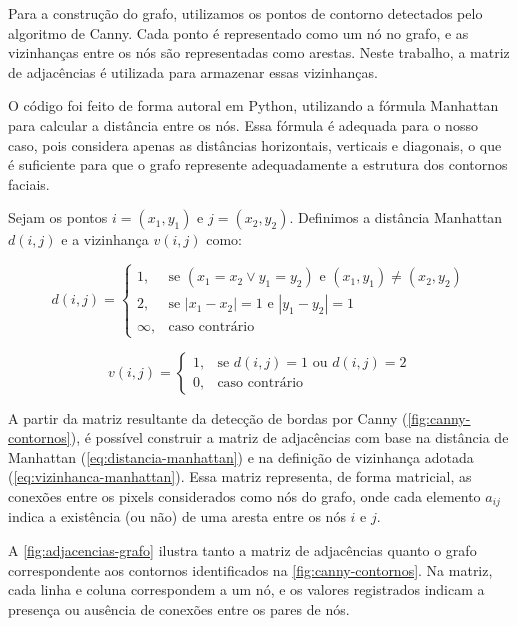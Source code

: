 Para a construção do grafo, utilizamos os pontos de contorno detectados pelo algoritmo de Canny. Cada ponto é representado como um nó no grafo, e as vizinhanças entre os nós são representadas como arestas. Neste trabalho, a matriz de adjacências é utilizada para armazenar essas vizinhanças.

O código foi feito de forma autoral em Python, utilizando a fórmula Manhattan para calcular a distância entre os nós. Essa fórmula é adequada para o nosso caso, pois considera apenas as distâncias horizontais, verticais e diagonais, o que é suficiente para que o grafo represente adequadamente a estrutura dos contornos faciais.

Sejam os pontos \( i = (x_1, y_1) \) e \( j = (x_2, y_2) \). Definimos a distância Manhattan \( d(i, j) \) e a vizinhança \( v(i, j) \) como:

\begin{equation}
    \label{eq:distancia-manhattan}
    d(i, j) =
    \begin{cases}
    1, & \text{se } (x_1 = x_2 \lor y_1 = y_2) \text{ e } (x_1, y_1) \neq (x_2, y_2) \\
    2, & \text{se } |x_1 - x_2| = 1 \text{ e } |y_1 - y_2| = 1 \\
    \infty, & \text{caso contrário}
    \end{cases}
\end{equation}

\begin{equation}
    \label{eq:vizinhanca-manhattan}
    v(i, j) =
    \begin{cases}
    1, & \text{se } d(i, j) = 1 \text{ ou } d(i, j) = 2 \\
    0, & \text{caso contrário}
    \end{cases}
\end{equation}


A partir da matriz resultante da detecção de bordas por Canny (\autoref{fig:canny-contornos}), é possível construir a matriz de adjacências com base na distância de Manhattan (\ref{eq:distancia-manhattan}) e na definição de vizinhança adotada (\ref{eq:vizinhanca-manhattan}). Essa matriz representa, de forma matricial, as conexões entre os pixels considerados como nós do grafo, onde cada elemento \( a_{ij} \) indica a existência (ou não) de uma aresta entre os nós \( i \) e \( j \).

A \autoref{fig:adjacencias-grafo} ilustra tanto a matriz de adjacências quanto o grafo correspondente aos contornos identificados na \autoref{fig:canny-contornos}. Na matriz, cada linha e coluna correspondem a um nó, e os valores registrados indicam a presença ou ausência de conexões entre os pares de nós.


